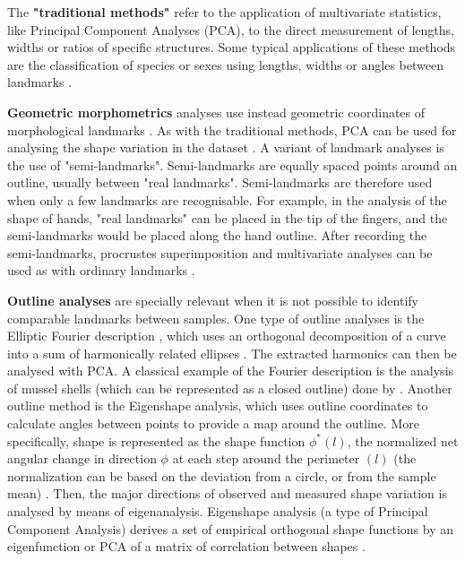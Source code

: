 The \textbf{"traditional methods"} refer to the application of multivariate statistics, like Principal Component Analyses (PCA), to the direct measurement of lengths, widths or ratios of specific structures. Some typical applications of these methods are the classification of species or sexes \citep{Jolicoeur1960} using lengths, widths or angles between landmarks \citep{Dryden1998}.

\textbf{Geometric morphometrics} analyses use instead geometric coordinates of morphological landmarks  \citep{Mitteroecker2009,zelditch2012geometric}. As with the traditional methods, PCA can be used for analysing the shape variation in the dataset \citep{Klingenberg2010}.
A variant of landmark analyses is the use of "semi-landmarks". Semi-landmarks are equally spaced points around an outline, usually between "real landmarks". Semi-landmarks are therefore used when only a few landmarks are recognisable. For example, in the analysis of the shape of hands, "real landmarks" can be placed in the tip of the fingers, and the semi-landmarks would be placed along the hand outline. After recording the semi-landmarks, procrustes superimposition and multivariate analyses can be used as with ordinary landmarks \citep{Dryden1998}.

\textbf{Outline analyses} are specially relevant when it is not possible to identify comparable landmarks between samples. 
%
One type of outline analyses is the Elliptic Fourier description \citep{Kuhl1982}, which uses an orthogonal decomposition of a curve into a sum of harmonically related ellipses \citep{Ferson1985}. The extracted harmonics can then be analysed with PCA. A classical example of the Fourier description is the analysis of mussel shells (which can be represented as a closed outline) done by \citet{Ferson1985}.
% 
Another outline method is the Eigenshape analysis, which uses outline coordinates to calculate angles between points to provide a map around the outline. More specifically, shape is represented as the shape function $\phi^{*}(l)$, the normalized net angular change in direction $\phi$ at each step around the perimeter $(l)$ (the normalization can be based on the deviation from a circle, or from the sample mean) \citep{Lohmann1983}. Then, the major directions of observed and measured shape variation is analysed by means of
eigenanalysis. 
Eigenshape analysis (a type of Principal Component Analysis) derives a set of empirical orthogonal shape functions by an eigenfunction or PCA of a matrix of correlation between shapes \citep{Lohmann1983}.


